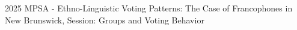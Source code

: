 
\nocite{*}

2025 MPSA - Ethno-Linguistic Voting Patterns: The Case of Francophones in New Brunswick, Session: Groups and Voting Behavior





